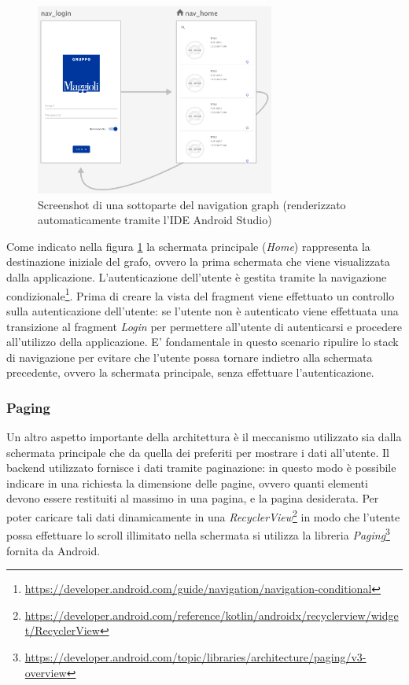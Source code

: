 \begin{figure}[H]
\centering
\includegraphics[width=0.7\textwidth]{img/Screenshot 2022-09-20 at 08.26.21.png}
\caption{Screenshot di una sottoparte del navigation graph (renderizzato automaticamente tramite l'IDE Android Studio)}
\label{fig:5.11}
\end{figure}

Come indicato nella figura \ref{fig:5.11} la schermata principale (\textit{Home}) rappresenta la destinazione iniziale del grafo, ovvero la prima schermata che viene visualizzata dalla applicazione. L'autenticazione dell'utente è gestita tramite la navigazione condizionale\footnote{\url{https://developer.android.com/guide/navigation/navigation-conditional}}. Prima di creare la vista del fragment viene effettuato un controllo sulla autenticazione dell'utente: se l'utente non è autenticato viene effettuata una transizione al fragment \textit{Login} per permettere all'utente di autenticarsi e procedere all'utilizzo della applicazione. E' fondamentale in questo scenario ripulire lo stack di navigazione per evitare che l'utente possa tornare indietro alla schermata precedente, ovvero la schermata principale, senza effettuare l'autenticazione.\\

\subsubsection{Paging}
Un altro aspetto importante della architettura è il meccanismo utilizzato sia dalla schermata principale che da quella dei preferiti per mostrare i dati all'utente. Il backend utilizzato fornisce i dati tramite paginazione: in questo modo è possibile indicare in una richiesta la dimensione delle pagine, ovvero quanti elementi devono essere restituiti al massimo in una pagina, e la pagina desiderata. Per poter caricare tali dati dinamicamente in una \textit{RecyclerView}\footnote{\url{https://developer.android.com/reference/kotlin/androidx/recyclerview/widget/RecyclerView}} in modo che l'utente possa effettuare lo scroll illimitato nella schermata si utilizza la libreria \textit{Paging}\footnote{\url{https://developer.android.com/topic/libraries/architecture/paging/v3-overview}} fornita da Android.

